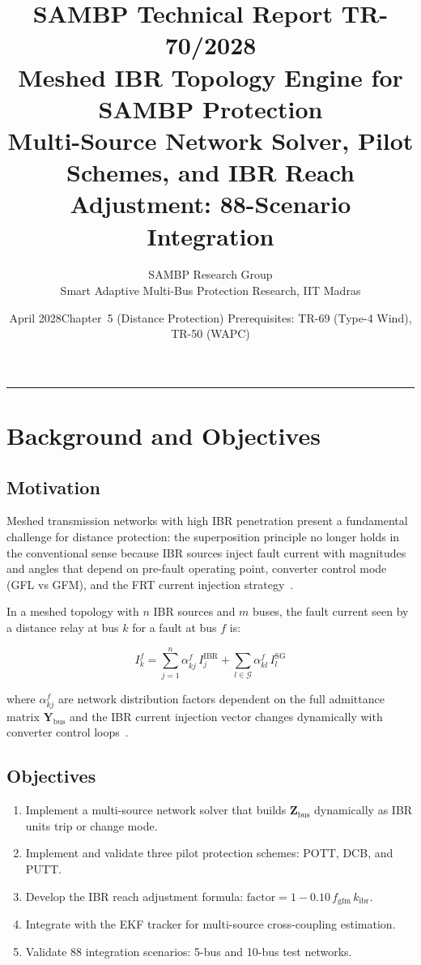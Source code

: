 \documentclass[11pt, a4paper]{article}
\title{\textbf{\textsf{\color{sambpblue}SAMBP Technical Report TR-70/2028}}\\[6pt]
  \Large Meshed IBR Topology Engine for SAMBP Protection\\[4pt]
  \normalsize Multi-Source Network Solver, Pilot Schemes, and
  IBR Reach Adjustment: 88-Scenario Integration}
\author{SAMBP Research Group\\[2pt]
  \small Smart Adaptive Multi-Bus Protection Research, IIT Madras}
\date{April 2028\quad\textbar\quad Chapter~5 (Distance Protection)\quad\textbar\quad
  Prerequisites: TR-69 (Type-4 Wind), TR-50 (WAPC)}
\newcommand{\kibr}{k_{\mathrm{ibr}}}
\newcommand{\fgfm}{f_{\mathrm{gfm}}}
\begin{document}
\maketitle
\tableofcontents
\vspace{6pt}\hrule\vspace{10pt}

\section{Background and Objectives}
\label{sec:background}

\subsection{Motivation}

Meshed transmission networks with high IBR penetration present a fundamental
challenge for distance protection: the superposition principle no longer holds
in the conventional sense because IBR sources inject fault current with
magnitudes and angles that depend on pre-fault operating point, converter
control mode (GFL vs GFM), and the FRT current injection strategy~\cite{Lin2020}.

In a meshed topology with $n$ IBR sources and $m$ buses, the fault current
seen by a distance relay at bus $k$ for a fault at bus $f$ is:

\begin{equation}
  I_k^f = \sum_{j=1}^{n} \alpha_{kj}^f \, I_j^{\mathrm{IBR}}
    + \sum_{l \in \mathcal{G}} \alpha_{kl}^f \, I_l^{\mathrm{SG}}
  \label{eq:meshed_fault}
\end{equation}

\noindent where $\alpha_{kj}^f$ are network distribution factors dependent on
the full admittance matrix $\mathbf{Y}_{\mathrm{bus}}$ and the IBR current
injection vector changes dynamically with converter control loops~\cite{Hooshyar2019}.

\subsection{Objectives}

\begin{enumerate}
  \item Implement a multi-source network solver that builds $\mathbf{Z}_{\mathrm{bus}}$
    dynamically as IBR units trip or change mode.
  \item Implement and validate three pilot protection schemes: POTT, DCB, and PUTT.
  \item Develop the IBR reach adjustment formula:
    $\mathrm{factor} = 1 - 0.10\,\fgfm\,\kibr$.
  \item Integrate with the EKF tracker for multi-source cross-coupling estimation.
  \item Validate 88 integration scenarios: 5-bus and 10-bus test networks.
\end{enumerate}
\end{document}
